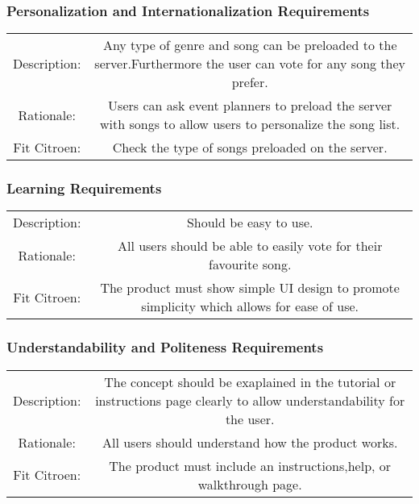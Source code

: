 \documentclass[12pt, titlepage]{article}
\begin{document}
\subsubsection{Personalization and Internationalization Requirements}
\begin{center}
\begin{tabular}{| c | c | }
\hline
Description: &Any type of genre and song can be preloaded to the server.Furthermore the user can vote for any song they prefer.\\ 
Rationale: & Users can ask event planners to preload the server with songs to allow users to personalize the song list.\\
Fit Citroen: & Check the type of songs preloaded on the server. \\
\hline
\end{tabular}
\end{center}
\subsubsection{Learning Requirements}
\begin{center}
\begin{tabular}{| c | c | }
\hline
Description: &Should be easy to use.\\ 
Rationale: & All users should be able to easily vote for their favourite song.\\
Fit Citroen: & The product must show simple UI design to promote simplicity which allows for ease of use. \\
\hline
\end{tabular}
\end{center}
\subsubsection{Understandability and Politeness Requirements}
\begin{center}
\begin{tabular}{| c | c | }
\hline
Description: &The concept should be exaplained in the tutorial or instructions page clearly to allow understandability for the user.\\ 
Rationale: & All users should understand how the product works.\\
Fit Citroen: & The product must include an instructions,help, or walkthrough page. \\
\hline
\end{tabular}
\end{center}
\end{document}
